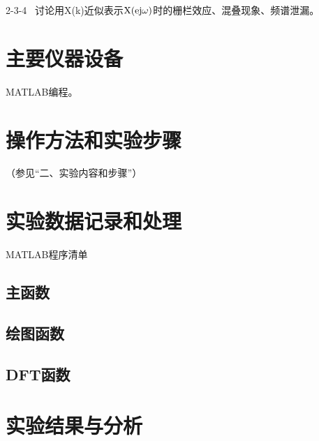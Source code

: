 \documentclass{../source/Experiment copy}
\begin{document}
    2-3-4 \, 讨论用X(k)近似表示$\rm  X(ej\omega)$时的栅栏效应、混叠现象、频谱泄漏。


    \section{主要仪器设备}
    
    MATLAB编程。

    \section{操作方法和实验步骤}

    （参见“二、实验内容和步骤”）

    \section{实验数据记录和处理}
    
        MATLAB程序清单
        \subsection{主函数}
        
        \subsection{绘图函数}
        
        \subsection{DFT函数}
        
    \section{实验结果与分析}
\end{document}

